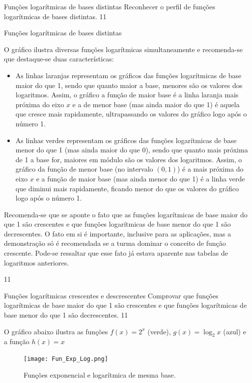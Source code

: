\clearmargin
\begin{objectives}{Funções logarítmicas de bases distintas}
{
	Reconhecer o perfil de funções logarítmicas de bases distintas.
}{1}{1}
\end{objectives}
\begin{sugestions}{Funções logarítmicas de bases distintas}
{
	O gráfico ilustra diversas funções logarítmicas simultaneamente e recomenda-se que destaque-se duas características:
	\begin{itemize}
	\item As linhas laranjas representam os gráficos das funções logarítmicas de base maior do que 1, sendo que quanto maior a base, menores são os valores dos logaritmos. Assim, o gráfico a função de maior base é a linha laranja mais próxima do eixo $x$ e a de menor base (mas ainda maior do que 1) é aquela que cresce mais rapidamente, ultrapassando os valores do gráfico logo após o número 1.
	\item As linhas verdes representam os gráficos das funções logarítmicas de base menor do que 1 (mas ainda maior do que 0), sendo que quanto mais próxima de 1 a base for, maiores em módulo são os valores dos logaritmos. Assim, o gráfico da função de menor base (no intervalo $(0,1)$) é a mais próxima do eixo $x$ e a função de maior base (mas ainda menor do que 1) é a linha verde que diminui mais rapidamente, ficando menor do que os valores do gráfico logo após o número 1.
	\end{itemize}
	Recomenda-se que se aponte o fato que as funções logarítmicas de base maior do que 1 são crescentes e que funções logarítmicas de base menor do que 1 são decrescentes. O fato em si é importante, inclusive para as aplicações, mas a demonstração só é recomendada se a turma dominar o conceito de função crescente. Pode-se ressaltar que esse fato já estava aparente nas tabelas de logaritmos anteriores.
}{1}{1}
\end{sugestions}
\begin{objectives}{Funções logarítmicas crescentes e descrescentes}
{
	Comprovar que funções logarítmicas de base maior do que 1 são crescentes e que funções logarítmicas de base menor do que 1 são decrescentes.
}{1}{1}
\end{objectives}



O gráfico abaixo ilustra as funções $f(x)=2^x$ (verde), $g(x)=\log_2 x$ (azul) e a função $h(x)=x$

\begin{figure}[H]
\centering

\texttt{[image: Fun\_Exp\_Log.png]}
\caption{Funções exponencial e logarítmica de mesma base.}

\end{figure}

